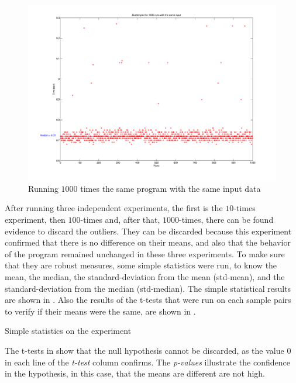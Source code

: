 \begin{figure}
  \centering
  \includegraphics[width=1.00\linewidth]{Figures/nt1000}
  \caption{Running $1000$ times the same program with the same input data}
  \label{fig:gauss}
\end{figure}

After running three independent experiments, the first is the $10$-times experiment, then $100$-times and, after that, $1000$-times, there can be found evidence to discard the outliers. They can be discarded because this experiment confirmed that there is no difference on their means, and also that the behavior of the program remained unchanged in these three experiments. To make sure that they are robust measures, some simple statistics were run, to know the mean, the median, the standard-deviation from the mean (std-mean), and the standard-deviation from the median (std-median). The simple statistical results are shown in . Also the results of the t-tests that were run on each sample pairs to verify if their means were the same, are shown in .

\begin{table}
  \centering
  \begin{tiny}
  
  \end{tiny}
  \caption{Simple statistics on the experiment}
  \label{tab:robustTest}
\end{table}

The t-tests in  show that the null hypothesis cannot be discarded, as the value $0$ in each line of the \emph{t-test} column confirms. The \emph{p-values} illustrate the confidence in the hypothesis, in this case, that the means are different are not high.

